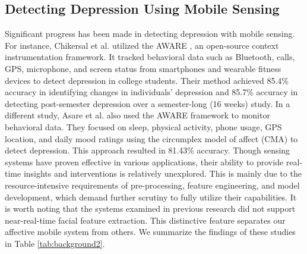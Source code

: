 \subsection{Detecting Depression Using Mobile Sensing} \label{DepressionMobileSensing}
Significant progress has been made in detecting depression with mobile sensing. For instance, Chikersal et al. \cite{chikersal2021detecting} utilized the AWARE \cite{ferreira2015aware}, an open-source context instrumentation framework. It tracked behavioral data such as Bluetooth, calls, GPS, microphone, and screen status from smartphones and wearable fitness devices to detect depression in college students. Their method achieved 85.4\% accuracy in identifying changes in individuals' depression and 85.7\% accuracy in detecting post-semester depression over a semester-long (16 weeks) study. In a different study, Asare et al. \cite{opoku2022mood} also used the AWARE framework to monitor behavioral data. They focused on sleep, physical activity, phone usage, GPS location, and daily mood ratings using the circumplex model of affect (CMA) to detect depression. This approach resulted in 81.43\% accuracy. Though sensing systems have proven effective in various applications, their ability to provide real-time insights and interventions is relatively unexplored. This is mainly due to the resource-intensive requirements of pre-processing, feature engineering, and model development, which demand further scrutiny to fully utilize their capabilities. It is worth noting that the systems examined in previous research did not support near-real-time facial feature extraction. This distinctive feature separates our affective mobile system from others. We summarize the findings of these studies in Table \ref{tab:background2}.

